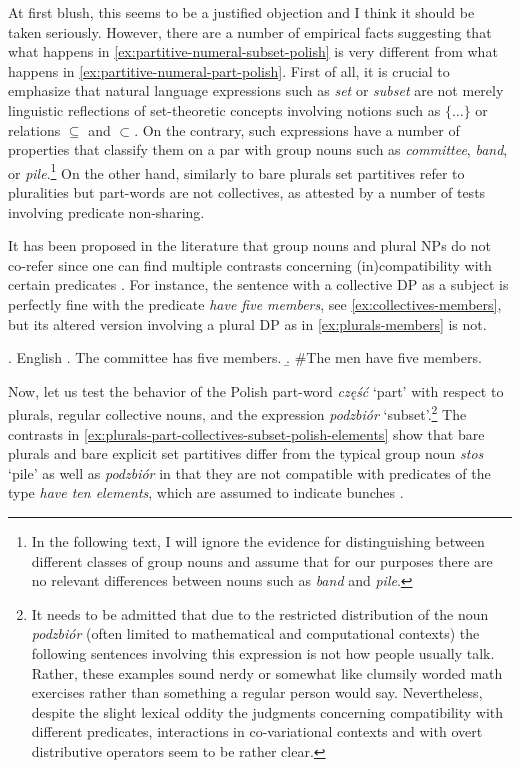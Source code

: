 At first blush, this seems to be a justified objection and I think it should be taken seriously. However, there are a number of empirical facts suggesting that what happens in \ref{ex:partitive-numeral-subset-polish} is very different from what happens in \ref{ex:partitive-numeral-part-polish}. First of all, it is crucial to emphasize that natural language expressions such as \textit{set} or \textit{subset} are not merely linguistic reflections of set-theoretic concepts involving notions such as $\{\dots\}$ or relations $\subseteq$ and $\subset$. On the contrary, such expressions have a number of properties that classify them on a par with group nouns such as \textit{committee}, \textit{band}, or \textit{pile}.\footnote{In the following text, I will ignore the evidence for distinguishing between different classes of group nouns \citep[see][]{pearson2011new,henderson2017swarms,docekal_wagiel2018decomposing} and assume that for our purposes there are no relevant differences between nouns such as \textit{band} and \textit{pile}.} On the other hand, similarly to bare plurals set partitives refer to pluralities but part-words are not collectives, as attested by a number of tests involving predicate non-sharing. 

It has been proposed in the literature that group nouns and plural NPs do not co-refer since one can find multiple contrasts concerning (in)compatibility with certain predicates \citep{barker1992group,schwarzschild1996pluralities}. For instance, the sentence with a collective DP as a subject is perfectly fine with the predicate \textit{have five members}, see \ref{ex:collectives-members}, but its altered version involving a plural DP as in \ref{ex:plurals-members} is not.

\ex.\label{ex:collectives-plurals-members} English \citep[p. 153]{lonning1987mass}
\a. The committee has five members.\label{ex:collectives-members}
\b. \#The men have five members.\label{ex:plurals-members}

Now, let us test the behavior of the Polish part-word \textit{część} `part' with respect to plurals, regular collective nouns, and the expression \textit{podzbiór} `subset'.\footnote{It needs to be admitted that due to the restricted distribution of the noun \textit{podzbiór} (often limited to mathematical and computational contexts) the following sentences involving this expression is not how people usually talk. Rather, these examples sound nerdy or somewhat like clumsily worded math exercises rather than something a regular person would say. Nevertheless, despite the slight lexical oddity the judgments concerning compatibility with different predicates, interactions in co-variational contexts and with overt distributive operators seem to be rather clear.} The contrasts in \ref{ex:plurals-part-collectives-subset-polish-elements} show that bare plurals and bare explicit set partitives differ from the typical group noun \textit{stos} `pile' as well as \textit{podzbiór} in that they are not compatible with predicates of the type \textit{have ten elements}, which are assumed to indicate bunches \citep{schwarzschild1996pluralities}. 

